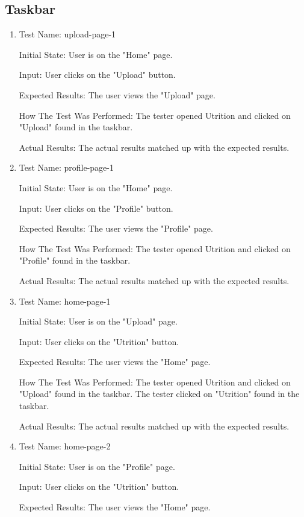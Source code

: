 \documentclass[12pt, titlepage]{article}
\begin{document}
	\subsection{Taskbar}
	\begin{enumerate}
	\item{Test Name: upload-page-1}
	
	Initial State: User is on the "Home" page.
	
	Input: User clicks on the "Upload" button.
	
	Expected Results: The user views the "Upload" page.
	
	How The Test Was Performed: The tester opened Utrition and clicked on "Upload" found in the taskbar.
	
	Actual Results: The actual results matched up with the expected results.
	
	\item{Test Name: profile-page-1}
	
	Initial State: User is on the "Home" page.
	
	Input: User clicks on the "Profile" button.
	
	Expected Results: The user views the "Profile" page.
	
	How The Test Was Performed: The tester opened Utrition and clicked on "Profile" found in the taskbar.
	
	Actual Results: The actual results matched up with the expected results.
	
	\item{Test Name: home-page-1}
	
	Initial State: User is on the "Upload" page.
	
	Input: User clicks on the "Utrition" button.
	
	Expected Results: The user views the "Home" page.
	
	How The Test Was Performed: The tester opened Utrition and clicked on "Upload" found in the taskbar. The tester clicked on "Utrition" found in the taskbar.
	
	Actual Results: The actual results matched up with the expected results.
	
	\item{Test Name: home-page-2}
	
	Initial State: User is on the "Profile" page.
	
	Input: User clicks on the "Utrition" button.
	
	Expected Results: The user views the "Home" page.
	

\end{enumerate}
\end{document}
